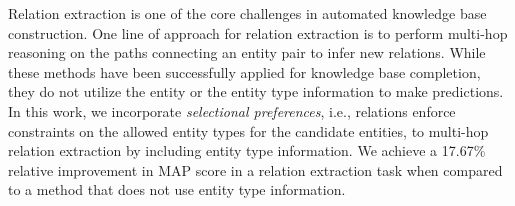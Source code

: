 Relation extraction is one of the core challenges in automated knowledge base construction. One line of approach for relation extraction is to perform multi-hop reasoning on the paths connecting an entity pair to infer new relations. While these methods have been successfully applied for knowledge base completion, they do not utilize the entity or the entity  type information to make predictions. In this work, we incorporate {\it selectional preferences}, i.e., relations enforce constraints on the allowed entity types for the candidate entities,  to multi-hop relation extraction by including entity type information.  We achieve a 17.67\% relative improvement in MAP score in a relation extraction task when compared to a method that does not use entity type information.

